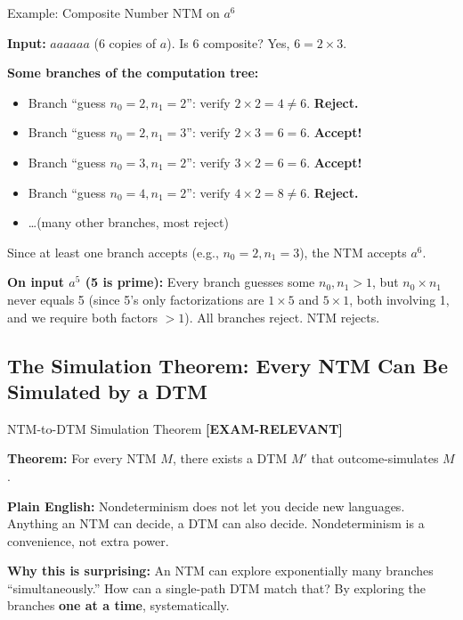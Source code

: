 \documentclass[11pt,a4paper]{article}
\newcommand{\kemark}{\textcolor{red!70!black}{\textbf{[EXAM-RELEVANT]}}}
\begin{document}
\begin{examplebox}{Example: Composite Number NTM on $a^6$}

\textbf{Input:} $aaaaaa$ (6 copies of $a$). Is 6 composite? Yes, $6 = 2 \times 3$.

\textbf{Some branches of the computation tree:}
\begin{itemize}[nosep]
\item Branch ``guess $n_0=2, n_1=2$'': verify $2 \times 2 = 4 \neq 6$. \textbf{Reject.}
\item Branch ``guess $n_0=2, n_1=3$'': verify $2 \times 3 = 6 = 6$. \textbf{Accept!}
\item Branch ``guess $n_0=3, n_1=2$'': verify $3 \times 2 = 6 = 6$. \textbf{Accept!}
\item Branch ``guess $n_0=4, n_1=2$'': verify $4 \times 2 = 8 \neq 6$. \textbf{Reject.}
\item \ldots (many other branches, most reject)
\end{itemize}

Since at least one branch accepts (e.g., $n_0=2, n_1=3$), the NTM accepts $a^6$.

\textbf{On input $a^5$ (5 is prime):} Every branch guesses some $n_0, n_1 > 1$, but $n_0 \times n_1$ never equals 5 (since 5's only factorizations are $1 \times 5$ and $5 \times 1$, both involving 1, and we require both factors $> 1$). All branches reject. NTM rejects.
\end{examplebox}

\subsection{The Simulation Theorem: Every NTM Can Be Simulated by a DTM}

\begin{conceptbox}{NTM-to-DTM Simulation Theorem \kemark}

\textbf{Theorem:} For every NTM $M$, there exists a DTM $M'$ that outcome-simulates $M$.

\textbf{Plain English:} Nondeterminism does not let you decide new languages. Anything an NTM can decide, a DTM can also decide. Nondeterminism is a convenience, not extra power.

\textbf{Why this is surprising:} An NTM can explore exponentially many branches ``simultaneously.'' How can a single-path DTM match that? By exploring the branches \textbf{one at a time}, systematically.
\end{conceptbox}
\end{document}
